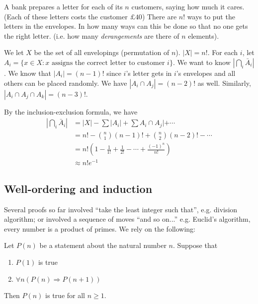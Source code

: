\documentclass[a4paper]{article}
\begin{document}
  \begin{eg}
    A bank prepares a letter for each of its $n$ customers, saying how much it cares. (Each of these letters costs the customer $\pounds 40$) There are $n!$ ways to put the letters in the envelopes. In how many ways can this be done so that no one gets the right letter. (i.e. how many \emph{derangements} are there of $n$ elements).

    We let $X$ be the set of all envelopings (permutation of $n$). $|X| = n!$. For each $i$, let $A_i = \{x\in X: x \text{ assigns the correct letter to customer }i\}$. We want to know $|\bigcap_i \bar A_i|$. We know that $|A_i| = (n - 1)!$ since $i$'s letter gets in $i$'s envelopes and all others can be placed randomly. We have $|A_i\cap A_j| = (n - 2)!$ as well. Similarly, $|A_i\cap A_j \cap A_k| = (n - 3)!$.

    By the inclusion-exclusion formula, we have
    \begin{align*}
      |\bigcap_i \bar A_i| &= |X| - \sum |A_i| + \sum A_i\cap A_j| + \cdots\\
      &= n! - {n\choose 1}(n - 1)! + {n\choose 2}(n - 2)! - \cdots\\
      &= n!\left(1 - \frac{1}{1!} + \frac{1}{2!} - \cdots + \frac{(-1)^n}{n!}\right)\\
      &\approx n! e^{-1}
    \end{align*}
  \end{eg}
  \subsection{Well-ordering and induction}
  Several proofs so far involved ``take the least integer such that'', e.g. division algorithm; or involved a sequence of moves ``and so on...'' e.g. Euclid's algorithm, every number is a product of primes. We rely on the following:
  \begin{thm}
    Let $P(n)$ be a statement about the natural number $n$. Suppose that 
    \begin{enumerate}
      \item $P(1)$ is true
      \item $\forall n(P(n)\Rightarrow P(n + 1))$
    \end{enumerate}
    Then $P(n)$ is true for all $n\geq 1$.
  \end{thm}
\end{document}
